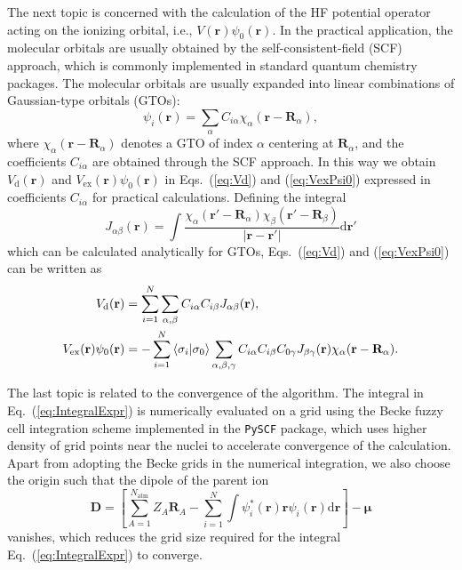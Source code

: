 \documentclass[preprint,12pt]{elsarticle} %
\newcommand{\bn}[1]{\mathbf{#1}}    %
\newcommand{\bi}[1]{\bm{#1}}        %
\renewcommand{\rm}[1]{\mathrm{#1}}    %
\newcommand{\dd}{\mathrm{d}}    %
\newcommand{\abs}[1]{\lvert #1 \rvert}  %
\begin{document}
The next topic is concerned with the calculation of the HF potential operator acting on the ionizing orbital, i.e., $V(\bn{r}) \psi_0(\bn{r})$. In the practical application, the molecular orbitals are usually obtained by the self-consistent-field (SCF) approach, which is commonly implemented in standard quantum chemistry packages. The molecular orbitals are usually expanded into linear combinations of Gaussian-type orbitals (GTOs):
\begin{equation}
    \psi_i(\bn{r})=\sum_\alpha C_{i \alpha} \chi_\alpha(\bn{r}-\bn{R}_\alpha),
\end{equation}
where $\chi_\alpha(\bn{r}-\bn{R}_\alpha)$ denotes a GTO of index $\alpha$ centering at $\bn{R}_\alpha$, and the coefficients $C_{i \alpha}$ are obtained through the SCF approach.
In this way we obtain $V_{\rm{d}}(\bn{r})$ and $V_{\rm{ex}}(\bn{r})\psi_0(\bn{r})$ in Eqs.~(\ref{eq:Vd}) and (\ref{eq:VexPsi0}) expressed in coefficients $C_{i \alpha}$ for practical calculations. Defining the integral
\begin{equation}
    J_{\alpha\beta}(\bn{r}) = \int \frac{\chi_\alpha(\bn{r}'-\bn{R}_\alpha) \chi_\beta(\bn{r}'-\bn{R}_\beta)}{\abs{\bn{r}-\bn{r}'}} \dd \bn{r}'
\end{equation}
which can be calculated analytically for GTOs,
Eqs.~(\ref{eq:Vd}) and (\ref{eq:VexPsi0}) can be written as
\begin{align}
     V_{\rm{d}}(\bn{r}) &= \sum_{i=1}^{N} \sum_{\alpha,\beta} C_{i\alpha} C_{i\beta} J_{\alpha\beta}(\bn{r}), \\
     V_{\rm{ex}}(\bn{r})\psi_0(\bn{r}) &= - \sum_{i=1}^{N} \braket{\sigma_i | \sigma_0} \sum_{\alpha,\beta,\gamma} C_{i\alpha} C_{i\beta} C_{0\gamma} J_{\beta\gamma}(\bn{r}) \chi_\alpha(\bn{r}-\bn{R}_\alpha).
\end{align}

The last topic is related to the convergence of the algorithm. The integral in Eq.~(\ref{eq:IntegralExpr}) is numerically evaluated on a grid using the Becke fuzzy cell integration scheme \cite{becke_multicenter_1988} implemented in the \texttt{PySCF} package, which uses higher density of grid points near the nuclei to accelerate convergence of the calculation. Apart from adopting the Becke grids in the numerical integration, we also choose the origin such that the dipole of the parent ion
\begin{equation}
    \bn{D} = \left[\sum_{A=1}^{N_{\rm{atm}}} Z_A \bn{R}_A - \sum_{i=1}^N \int \psi_i^*(\bn{r}) \bn{r} \psi_i(\bn{r}) \dd \bn{r} \right] - \bi{\mu}
    \label{eq:ParentIonDipole}
\end{equation}
vanishes, which reduces the grid size required for the integral Eq.~(\ref{eq:IntegralExpr}) to converge.
\end{document}
